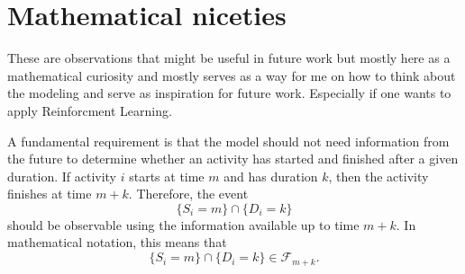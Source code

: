 \documentclass[11pt,a4paper]{article}
\newcommand{\cF}{\mathcal{F}}
\newcommand{\1}{\mathbf{1}}
\theoremstyle{definition}
\theoremstyle{plain}
\theoremstyle{remark}
\numberwithin{equation}{section}
\begin{document}
\section{Mathematical niceties}

 These are observations that might be useful in future work but mostly here as a mathematical curiosity and mostly serves as a way for me on how to think about the modeling and serve as inspiration for future work. Especially if one wants to apply Reinforcment Learning.


A fundamental requirement is that the model should not need information from the future to determine whether an activity has started and finished after a given duration. If activity $i$ starts at time $m$ and has duration $k$, then the activity finishes at time $m+k$. Therefore, the event
\[
\{S_i=m\}\cap \{D_i = k\}
\]
should be observable using the information available up to time $m+k$. In mathematical notation, this means that
\[
\{S_i=m\}\cap \{D_i = k\} \in \cF_{m+k}.
\]
\end{document}
